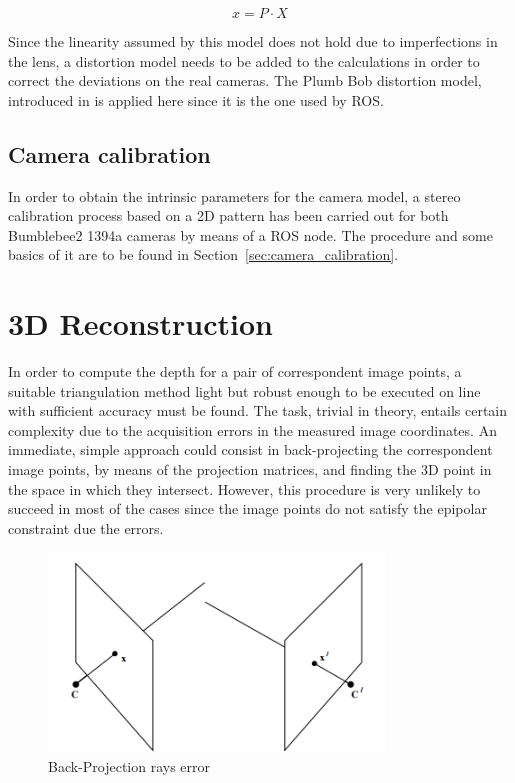 \begin{equation}
x = P \cdot X
\label{eq:pinhole_model}
\end{equation}

Since the linearity assumed by this model does not hold due to imperfections in the lens, a distortion model needs to be added to the calculations in order to correct the deviations on the real cameras.
The Plumb Bob distortion model, introduced in \cite{Brown} is applied here since it is the one used by ROS.


\subsection{Camera calibration}
\label{sec:cam_calib}
In order to obtain the intrinsic parameters for the camera model, a stereo calibration process based on a 2D pattern has been carried out for both Bumblebee2 1394a cameras by means of a ROS node.
The procedure and some basics of it are to be found in Section~\ref{sec:camera_calibration}.

\section{3D Reconstruction}
In order to compute the depth for a pair of correspondent image points, a suitable triangulation method light but robust enough to be executed on line with sufficient accuracy must be found.
The task, trivial in theory, entails certain complexity due to the acquisition errors in the measured image coordinates.
An immediate, simple approach could consist in back-projecting the correspondent image points, by means of the projection matrices, and finding the 3D point in the space in which they intersect.
However, this procedure is very unlikely to succeed in most of the cases since the image points do not satisfy the epipolar constraint due the errors.

\begin{figure}[h]
    \centering
    \includegraphics[width=0.8\textwidth]{figures/back_projection}
    \caption{Back-Projection rays error}
    \label{fig:Back-Projection}
\end{figure}

